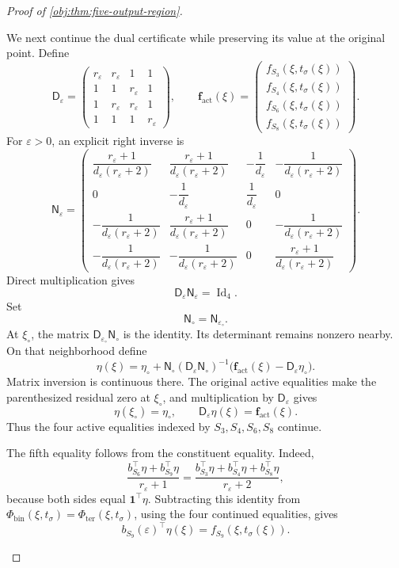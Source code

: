 \documentclass[11pt]{article}
\begin{document}
\begin{proof}[Proof of \cref{obj:thm:five-output-region}]
\begin{enumerate}
We next continue the dual certificate while preserving its value at the
original point. Define
\[
\mathsf D_\varepsilon=
\begin{pmatrix}
r_\varepsilon&r_\varepsilon&1&1\\
1&1&r_\varepsilon&1\\
1&r_\varepsilon&r_\varepsilon&1\\
1&1&1&r_\varepsilon
\end{pmatrix},
\qquad
\boldsymbol f_{\mathrm{act}}(\xi)=
\begin{pmatrix}
f_{S_3}(\xi,t_\sigma(\xi))\\
f_{S_4}(\xi,t_\sigma(\xi))\\
f_{S_6}(\xi,t_\sigma(\xi))\\
f_{S_8}(\xi,t_\sigma(\xi))
\end{pmatrix}.
\]
For \(\varepsilon>0\), an explicit right inverse is
\[
\mathsf N_\varepsilon=
\begin{pmatrix}
\dfrac{r_\varepsilon+1}{d_\varepsilon(r_\varepsilon+2)}
&\dfrac{r_\varepsilon+1}{d_\varepsilon(r_\varepsilon+2)}
&-\dfrac1{d_\varepsilon}
&-\dfrac1{d_\varepsilon(r_\varepsilon+2)}\\
0&-\dfrac1{d_\varepsilon}&\dfrac1{d_\varepsilon}&0\\
-\dfrac1{d_\varepsilon(r_\varepsilon+2)}
&\dfrac{r_\varepsilon+1}{d_\varepsilon(r_\varepsilon+2)}
&0&-\dfrac1{d_\varepsilon(r_\varepsilon+2)}\\
-\dfrac1{d_\varepsilon(r_\varepsilon+2)}
&-\dfrac1{d_\varepsilon(r_\varepsilon+2)}
&0&\dfrac{r_\varepsilon+1}{d_\varepsilon(r_\varepsilon+2)}
\end{pmatrix}.
\]
Direct multiplication gives
\[
\mathsf D_\varepsilon\mathsf N_\varepsilon=\operatorname{Id}_4.
\]
Set
\[
\mathsf N_\circ=\mathsf N_{\varepsilon_\circ}.
\]
At \(\xi_\circ\), the matrix
\(\mathsf D_{\varepsilon_\circ}\mathsf N_\circ\) is the identity.
Its determinant remains nonzero nearby. On that neighborhood define
\[
\eta(\xi)
=
\eta_\circ+
\mathsf N_\circ
(\mathsf D_\varepsilon\mathsf N_\circ)^{-1}
\bigl(\boldsymbol f_{\mathrm{act}}(\xi)
      -\mathsf D_\varepsilon\eta_\circ\bigr).
\]
Matrix inversion is continuous there. The original active equalities
make the parenthesized residual zero at \(\xi_\circ\), and multiplication
by \(\mathsf D_\varepsilon\) gives
\[
\eta(\xi_\circ)=\eta_\circ,
\qquad
\mathsf D_\varepsilon\eta(\xi)=\boldsymbol f_{\mathrm{act}}(\xi).
\]
Thus the four active equalities indexed by \(S_3,S_4,S_6,S_8\) continue.

The fifth equality follows from the constituent equality. Indeed,
\[
\frac{b_{S_6}^\top\eta+b_{S_9}^\top\eta}{r_\varepsilon+1}
=
\frac{b_{S_3}^\top\eta+b_{S_4}^\top\eta+b_{S_8}^\top\eta}
     {r_\varepsilon+2},
\]
because both sides equal \(\mathbf1^\top\eta\).
Subtracting this identity from
\(\Phi_{\mathrm{bin}}(\xi,t_\sigma)=
\Phi_{\mathrm{ter}}(\xi,t_\sigma)\), using the four continued
equalities, gives
\[
b_{S_9}(\varepsilon)^\top\eta(\xi)
=
f_{S_9}(\xi,t_\sigma(\xi)).
\]


\end{enumerate}
\end{proof}
\end{document}
